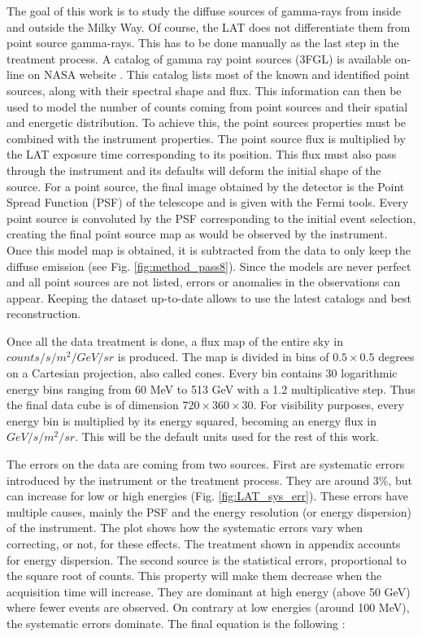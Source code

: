 The goal of this work is to study the diffuse sources of gamma-rays from inside and outside the Milky Way. Of course, the LAT does not differentiate them from point source gamma-rays. This has to be done manually as the last step in the treatment process. A catalog of gamma ray point sources (3FGL) is available on-line on NASA website . This catalog lists most of the known and identified point sources, along with their spectral shape and flux. This information can then be used to model the number of counts coming from point sources and their spatial and energetic distribution. To achieve this, the point sources properties must be combined with the instrument properties. The point source flux is multiplied by the LAT exposure time corresponding to its position. This flux must also pass through the instrument and its defaults will deform the initial shape of the source. For a point source, the final image obtained by the detector is the Point Spread Function (PSF) of the telescope and is given with the Fermi tools. Every point source is convoluted by the PSF corresponding to the initial event selection, creating the final point source map as would be observed by the instrument.
Once this model map is obtained, it is subtracted from the data to only keep the diffuse emission (see Fig. \ref{fig:method_pass8}). Since the models are never perfect and all point sources are not listed, errors or anomalies in the observations can appear. Keeping the dataset up-to-date allows to use the latest catalogs and best reconstruction.


Once all the data treatment is done, a flux map of the entire sky in $counts/s/m^2/GeV/sr$ is produced. The map is divided in bins of $0.5 \times 0.5$ degrees on a Cartesian projection, also called cones. Every bin contains 30 logarithmic energy bins ranging from 60 MeV to 513 GeV with a 1.2 multiplicative step. Thus the final data cube is of dimension $720 \times 360 \times 30$. For visibility purposes, every energy bin is multiplied by its energy squared, becoming an energy flux in $GeV/s/m^2/sr$. This will be the default units used for the rest of this work.

The errors on the data are coming from two sources. First are systematic errors introduced by the instrument or the treatment process. They are around 3\%, but can increase for low or high energies (Fig. \ref{fig:LAT_sys_err}). These errors have multiple causes, mainly the PSF and the energy resolution (or energy dispersion) of the instrument. The plot shows how the systematic errors vary when correcting, or not, for these effects. The treatment shown in appendix accounts for energy dispersion.
The second source is the statistical errors, proportional to the square root of counts. This property will make them decrease when the acquisition time will increase. They are dominant at high energy (above 50 GeV) where fewer events are observed. On contrary at low energies (around 100 MeV), the systematic errors dominate. The final equation is the following :

